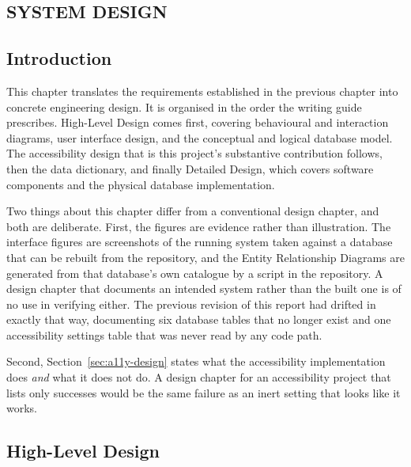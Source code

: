 \documentclass[12pt, oneside]{article} %
\begin{document}

\newpage
\vfill \null
\thispagestyle{empty}
\begin{center}
\section{SYSTEM DESIGN}
\end{center}
\vspace{2cm}

\subsection{Introduction}

This chapter translates the requirements established in the previous chapter into concrete engineering design. It is organised in the order the writing guide prescribes. High-Level Design comes first, covering behavioural and interaction diagrams, user interface design, and the conceptual and logical database model. The accessibility design that is this project's substantive contribution follows, then the data dictionary, and finally Detailed Design, which covers software components and the physical database implementation.

Two things about this chapter differ from a conventional design chapter, and both are deliberate. First, the figures are evidence rather than illustration. The interface figures are screenshots of the running system taken against a database that can be rebuilt from the repository, and the Entity Relationship Diagrams are generated from that database's own catalogue by a script in the repository. A design chapter that documents an intended system rather than the built one is of no use in verifying either. The previous revision of this report had drifted in exactly that way, documenting six database tables that no longer exist and one accessibility settings table that was never read by any code path.

Second, Section~\ref{sec:a11y-design} states what the accessibility implementation does \emph{and} what it does not do. A design chapter for an accessibility project that lists only successes would be the same failure as an inert setting that looks like it works.

\subsection{High-Level Design}
\end{document}
